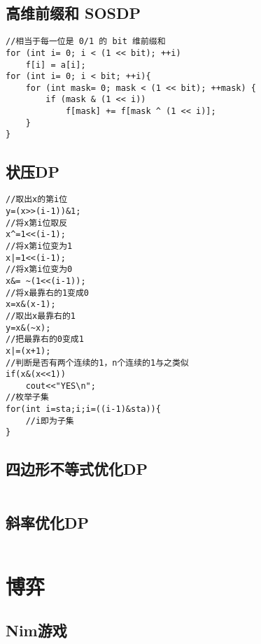 \documentclass[twocolumn,a4]{article}
\begin{document}
\subsection{高维前缀和 SOSDP}
\begin{lstlisting}
//相当于每一位是 0/1 的 bit 维前缀和
for (int i= 0; i < (1 << bit); ++i)
    f[i] = a[i];
for (int i= 0; i < bit; ++i){
	for (int mask= 0; mask < (1 << bit); ++mask) {
        if (mask & (1 << i))
            f[mask] += f[mask ^ (1 << i)];
    }
}
\end{lstlisting}

\subsection{状压DP}
\begin{lstlisting}
//取出x的第i位
y=(x>>(i-1))&1;
//将x第i位取反
x^=1<<(i-1);
//将x第i位变为1
x|=1<<(i-1);
//将x第i位变为0
x&= ~(1<<(i-1));
//将x最靠右的1变成0
x=x&(x-1);
//取出x最靠右的1
y=x&(~x);
//把最靠右的0变成1
x|=(x+1);
//判断是否有两个连续的1，n个连续的1与之类似
if(x&(x<<1))
    cout<<"YES\n";
//枚举子集
for(int i=sta;i;i=((i-1)&sta)){
    //i即为子集
}
\end{lstlisting}

\subsection{四边形不等式优化DP}
\begin{lstlisting}

\end{lstlisting}

\subsection{斜率优化DP}
\begin{lstlisting}

\end{lstlisting}

\section{博弈}

\subsection{Nim游戏}
\begin{lstlisting}

\end{lstlisting}
\end{document}
